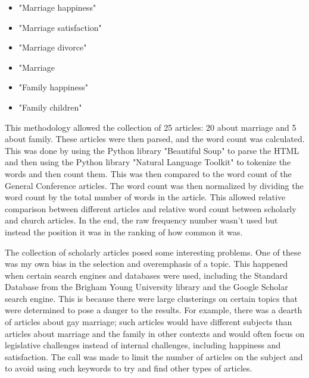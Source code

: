 \documentclass[twocolumn]{article}
\begin{document}
\begin{itemize}
    \item "Marriage happiness"
    \item "Marriage satisfaction"
    \item "Marriage divorce"
    \item "Marriage
    \item "Family happiness"
    \item "Family children"
\end{itemize}

This methodology allowed the collection of 25 articles: 20 about marriage and 5 about family. These articles were then parsed, and the word count was calculated. This was done by using the Python library "Beautiful Soup" to parse the HTML and then using the Python library "Natural Language Toolkit" to tokenize the words and then count them. This was then compared to the word count of the General Conference articles. The word count was then normalized by dividing the word count by the total number of words in the article. This allowed relative comparison between different articles and relative word count between scholarly and church articles. In the end, the raw frequency number wasn’t used but instead the position it was in the ranking of how common it was.

The collection of scholarly articles posed some interesting problems. One of these was my own bias in the selection and overemphasis of a topic. This happened when certain search engines and databases were used, including the Standard Database from the Brigham Young University library and the Google Scholar search engine. This is because there were large clusterings on certain topics that were determined to pose a danger to the results. For example, there was a dearth of articles about gay marriage; such articles would have different subjects than articles about marriage and the family in other contexts and would often focus on legislative challenges instead of internal challenges, including happiness and satisfaction. The call was made to limit the number of articles on the subject and to avoid using such keywords to try and find other types of articles.
\end{document}
